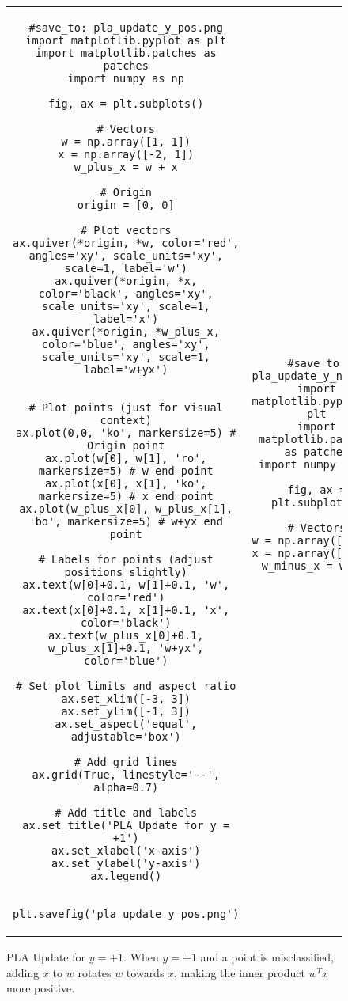 \documentclass{article}
\begin{document}
\begin{figure}[H]
    \centering
    \begin{tabular}{cc}
        \begin{verbatim}
#save_to: pla_update_y_pos.png
import matplotlib.pyplot as plt
import matplotlib.patches as patches
import numpy as np

fig, ax = plt.subplots()

# Vectors
w = np.array([1, 1])
x = np.array([-2, 1])
w_plus_x = w + x

# Origin
origin = [0, 0]

# Plot vectors
ax.quiver(*origin, *w, color='red', angles='xy', scale_units='xy', scale=1, label='w')
ax.quiver(*origin, *x, color='black', angles='xy', scale_units='xy', scale=1, label='x')
ax.quiver(*origin, *w_plus_x, color='blue', angles='xy', scale_units='xy', scale=1, label='w+yx')


# Plot points (just for visual context)
ax.plot(0,0, 'ko', markersize=5) # Origin point
ax.plot(w[0], w[1], 'ro', markersize=5) # w end point
ax.plot(x[0], x[1], 'ko', markersize=5) # x end point
ax.plot(w_plus_x[0], w_plus_x[1], 'bo', markersize=5) # w+yx end point

# Labels for points (adjust positions slightly)
ax.text(w[0]+0.1, w[1]+0.1, 'w', color='red')
ax.text(x[0]+0.1, x[1]+0.1, 'x', color='black')
ax.text(w_plus_x[0]+0.1, w_plus_x[1]+0.1, 'w+yx', color='blue')

# Set plot limits and aspect ratio
ax.set_xlim([-3, 3])
ax.set_ylim([-1, 3])
ax.set_aspect('equal', adjustable='box')

# Add grid lines
ax.grid(True, linestyle='--', alpha=0.7)

# Add title and labels
ax.set_title('PLA Update for y = +1')
ax.set_xlabel('x-axis')
ax.set_ylabel('y-axis')
ax.legend()


plt.savefig('pla_update_y_pos.png')
        \end{verbatim}
        \caption{PLA Update for \(y = +1\). When \(y = +1\) and a point is misclassified, adding \(x\) to \(w\) rotates \(w\) towards \(x\), making the inner product \(w^T x\) more positive.}
        \label{fig:pla_update_y_pos}
        &
        \begin{verbatim}
#save_to: pla_update_y_neg.png
import matplotlib.pyplot as plt
import matplotlib.patches as patches
import numpy as np

fig, ax = plt.subplots()

# Vectors
w = np.array([1, 1])
x = np.array([2, 1])
w_minus_x = w - x


\end{verbatim}
\end{tabular}
\end{figure}
\end{document}
